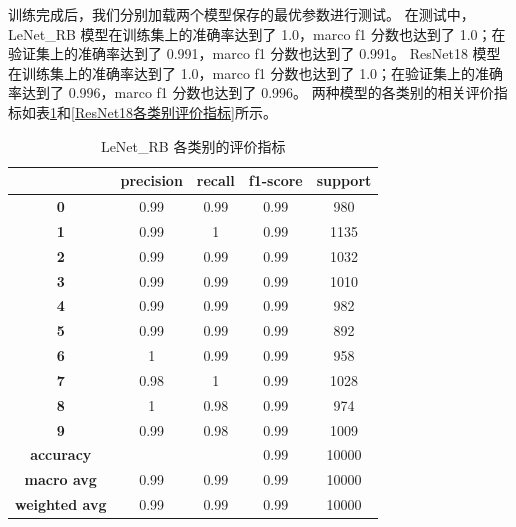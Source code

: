 \documentclass[supercite]{Experimental_Report}
\theoremstyle{definition}
\begin{document}
训练完成后，我们分别加载两个模型保存的最优参数进行测试。
在测试中，LeNet\_RB 模型在训练集上的准确率达到了 1.0，marco f1 分数也达到了 1.0；在验证集上的准确率达到了 0.991，marco f1 分数也达到了 0.991。
ResNet18 模型在训练集上的准确率达到了 1.0，marco f1 分数也达到了 1.0；在验证集上的准确率达到了 0.996，marco f1 分数也达到了 0.996。
两种模型的各类别的相关评价指标如表\ref{LeNetRB各类别评价指标}和\ref{ResNet18各类别评价指标}所示。
\begin{table}[H]
	\centering
	\caption{LeNet\_RB 各类别的评价指标}
	  \begin{tabular}{ccccc}
		\toprule
			& \textbf{precision} & \textbf{recall} & \textbf{f1-score} & \textbf{support} \\\hline
	  \textbf{0} & 0.99  & 0.99  & 0.99  & 980 \\
	  \textbf{1} & 0.99  & 1     & 0.99  & 1135 \\
	  \textbf{2} & 0.99  & 0.99  & 0.99  & 1032 \\
	  \textbf{3} & 0.99  & 0.99  & 0.99  & 1010 \\
	  \textbf{4} & 0.99  & 0.99  & 0.99  & 982 \\
	  \textbf{5} & 0.99  & 0.99  & 0.99  & 892 \\
	  \textbf{6} & 1     & 0.99  & 0.99  & 958 \\
	  \textbf{7} & 0.98  & 1     & 0.99  & 1028 \\
	  \textbf{8} & 1     & 0.98  & 0.99  & 974 \\
	  \textbf{9} & 0.99  & 0.98  & 0.99  & 1009 \\
	  \textbf{accuracy} &       &       & 0.99  & 10000 \\
	  \textbf{macro avg} & 0.99  & 0.99  & 0.99  & 10000 \\
	  \textbf{weighted avg} & 0.99  & 0.99  & 0.99  & 10000 \\\bottomrule
	  \end{tabular}
	\label{LeNetRB各类别评价指标}
  \end{table}
\end{document}

